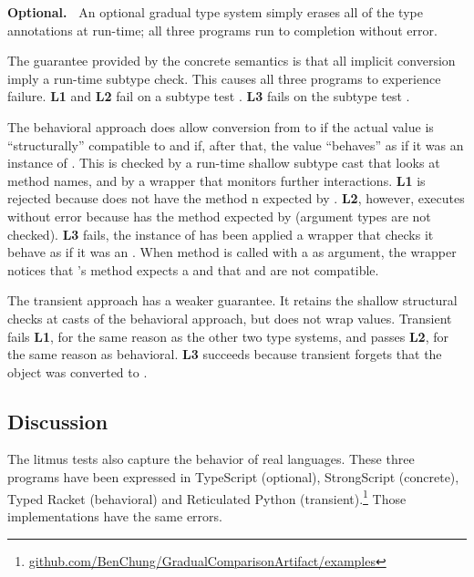 \documentclass[USenglish]{tex/lipics-v2016}
\begin{document}
\vspace{2mm}\noindent
{\bf Optional.~} An optional gradual type system simply erases all of the
type annotations at run-time; all three programs run to completion without
error.

\vspace{2mm} The guarantee provided by the
concrete semantics is that all implicit conversion imply a run-time subtype
check.  This causes all three programs to experience failure. {\bf L1} and
{\bf L2} fail on a subtype test \StrSub{}\K\A\I.  {\bf L3} fails on the
subtype test \StrSub{}\K\C\E.

\vspace{2mm} The behavioral approach does allow
conversion from \any to \C if the actual value is ``structurally''
compatible to \C and if, after that, the value ``behaves'' as if it was an
instance of \C.  This is checked by a run-time shallow subtype cast that
looks at method names, and by a wrapper that monitors further interactions.
{\bf L1} is rejected because \A does not have the method \xt n expected by
\I. {\bf L2}, however, executes without error because \A has the method \m
expected by \I (argument types are not checked). {\bf L3} fails, the
instance of \C has been applied a wrapper that checks it behave as if it was
an \E.  When method \a is called with a \C as argument, the wrapper notices
that \E's method \a expects a \D and that \C and \D are not compatible.

\vspace{2mm} The transient approach has a weaker
guarantee. It retains the shallow structural checks at casts of the
behavioral approach, but does not wrap values. Transient fails {\bf L1}, for
the same reason as the other two type systems, and passes {\bf L2}, for the
same reason as behavioral.  {\bf L3} succeeds because transient forgets that
the \C object was converted to \E.

\subsection{Discussion}

The litmus tests also capture the behavior of real languages. These three
programs have been expressed in TypeScript (optional), StrongScript
(concrete), Typed Racket (behavioral) and Reticulated Python
(transient).\footnote{\small
  \url{github.com/BenChung/GradualComparisonArtifact/examples}} Those
implementations have the same errors.
\end{document}
